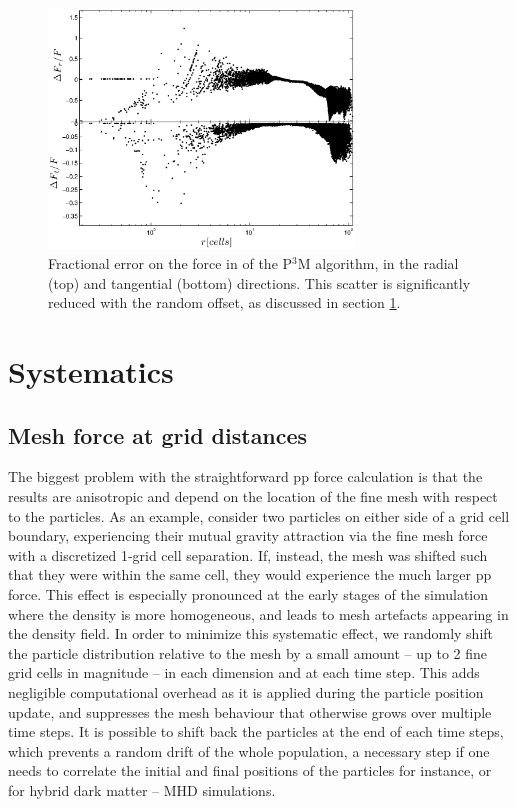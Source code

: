 \begin{figure}%
  \begin{center}
    \includegraphics[width=3.2in]{graphs/densityForce_fracErr.eps}
  \caption{Fractional error on the force in of the P$^3$M algorithm, in the radial (top) and tangential (bottom) directions.
  This scatter is significantly reduced with the random offset, as discussed in section \ref{sec:systematics}.
    \label{fig:den_force_fracErr}}
\end{center}
\end{figure}


\section{Systematics}
\label{sec:systematics}

\subsection{Mesh force at grid distances}

The biggest problem with the straightforward pp force calculation is that the results 
are anisotropic and depend on the location of the fine mesh with respect 
to the particles. As an example, consider two particles on either side of a grid 
cell boundary, experiencing their mutual gravity attraction via the fine mesh force with a discretized 1-grid cell separation.
 If, instead, the mesh was shifted such that they were
within the same cell, they would experience the much larger pp force. 
This effect is especially pronounced at the early stages of the simulation where
the density is more homogeneous, and leads to mesh artefacts appearing
in the density field. In order to minimize this systematic effect, 
we randomly shift the particle distribution relative to the mesh by a small
amount -- up to 2 fine grid cells in magnitude -- in each
dimension and at each time step.  This adds negligible computational
overhead as it is applied during the particle position update,
and suppresses the mesh behaviour that otherwise grows over multiple time steps.
It is possible to shift back the particles at the end of each time steps,
which prevents a random drift of the whole population, a necessary step 
if one needs to correlate the initial and final positions of the particles for instance,
or for hybrid dark matter -- MHD simulations.
 
